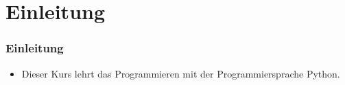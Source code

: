\documentclass[aspectratio=169,mathserif,notheorems]{beamer}%
\subtitle{Einleitung}%
\begin{document}
%
%
\startPresentation%
%
\section{Einleitung}%
%
\begin{frame}%
\frametitle{Einleitung}%
\begin{itemize}%
\item Dieser Kurs lehrt das Programmieren mit der Programmiersprache Python.%
\end{itemize}%
\end{frame}%
%
\endPresentation%
\end{document}
